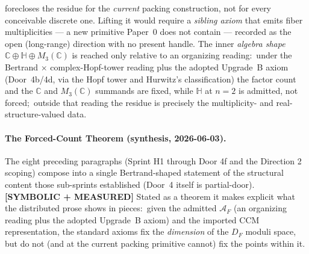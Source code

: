 \documentclass[11pt]{article}
\begin{document}
forecloses the residue for the \emph{current} packing construction, not
for every conceivable discrete one. Lifting it would require a
\emph{sibling axiom} that emits fiber multiplicities --- a new primitive
Paper~0 does not contain --- recorded as the open (long-range) direction
with no present handle. The inner \emph{algebra shape} $\mathbb{C}
\oplus \mathbb{H} \oplus M_3(\mathbb{C})$ is reached only relative to an
organizing reading:\ under the Bertrand $\times$ complex-Hopf-tower
reading plus the adopted Upgrade~B axiom (Door~4b/4d, via the Hopf tower
and Hurwitz's classification) the factor count and the $\mathbb{C}$ and
$M_3(\mathbb{C})$ summands are fixed, while $\mathbb{H}$ at $n = 2$ is
admitted, not forced;\ outside that reading the residue is precisely the
multiplicity- and real-structure-valued data.

\paragraph{The Forced-Count Theorem (synthesis, 2026-06-03).}
The eight preceding paragraphs (Sprint H1 through Door 4f and the
Direction 2 scoping) compose into a single Bertrand-shaped statement
of the structural content those sub-sprints established (Door~4 itself
is partial-door).  \textbf{[SYMBOLIC + MEASURED]} Stated as a theorem it makes explicit what the
distributed prose shows in pieces:\ given the admitted $\mathcal{A}_F$
(an organizing reading plus the adopted Upgrade~B axiom) and the imported
CCM representation, the standard axioms fix the \emph{dimension} of the
$D_F$ moduli space, but do not (and at the current packing primitive
cannot) fix the points within it.
\end{document}
